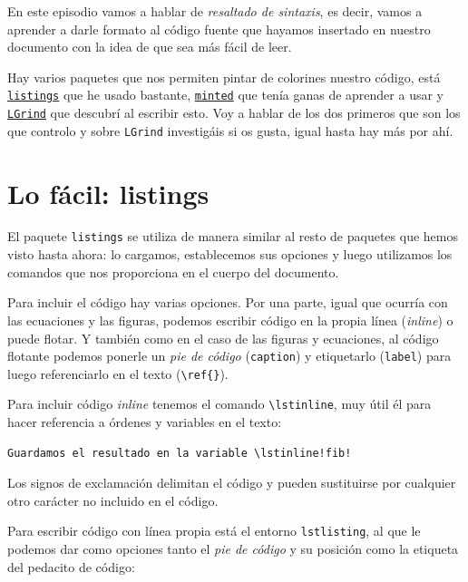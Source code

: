 En este episodio vamos a hablar de \emph{resaltado de sintaxis}, es
decir, vamos a aprender a darle formato al código fuente que hayamos
insertado en nuestro documento con la idea de que sea más fácil de leer.

Hay varios paquetes que nos permiten pintar de colorines nuestro código,
está
\href{http://www.ctan.org/tex-archive/macros/latex/contrib/listings/}{\lstinline!listings!}
que he usado bastante,
\href{http://www.ctan.org/tex-archive/macros/latex/contrib/minted/}{\lstinline!minted!}
que tenía ganas de aprender a usar y
\href{http://www.ctan.org/pkg/lgrind}{\lstinline!LGrind!} que descubrí
al escribir esto. Voy a hablar de los dos primeros que son los que
controlo y sobre \lstinline!LGrind! investigáis si os gusta, igual hasta
hay más por ahí.

\section{Lo fácil: listings}

El paquete \lstinline!listings! se utiliza de manera similar al resto de
paquetes que hemos visto hasta ahora: lo cargamos, establecemos sus
opciones y luego utilizamos los comandos que nos proporciona en el
cuerpo del documento.

Para incluir el código hay varias opciones. Por una parte, igual que
ocurría con las ecuaciones y las figuras, podemos escribir código en la
propia línea (\emph{inline}) o puede flotar. Y también como en el caso
de las figuras y ecuaciones, al código flotante podemos ponerle un
\emph{pie de código} (\lstinline!caption!) y etiquetarlo
(\lstinline!label!) para luego referenciarlo en el texto
(\lstinline!\ref{}!).

Para incluir código \emph{inline} tenemos el comando
\lstinline!\lstinline!, muy útil él para hacer referencia a órdenes y
variables en el texto:

\begin{lstlisting}[language={[latex]tex}]
Guardamos el resultado en la variable \lstinline!fib!
\end{lstlisting}

Los signos de exclamación delimitan el código y pueden sustituirse por
cualquier otro carácter no incluido en el código.

Para escribir código con línea propia está el entorno
\lstinline!lstlisting!, al que le podemos dar como opciones tanto el
\emph{pie de código} y su posición como la etiqueta del pedacito de
código:

